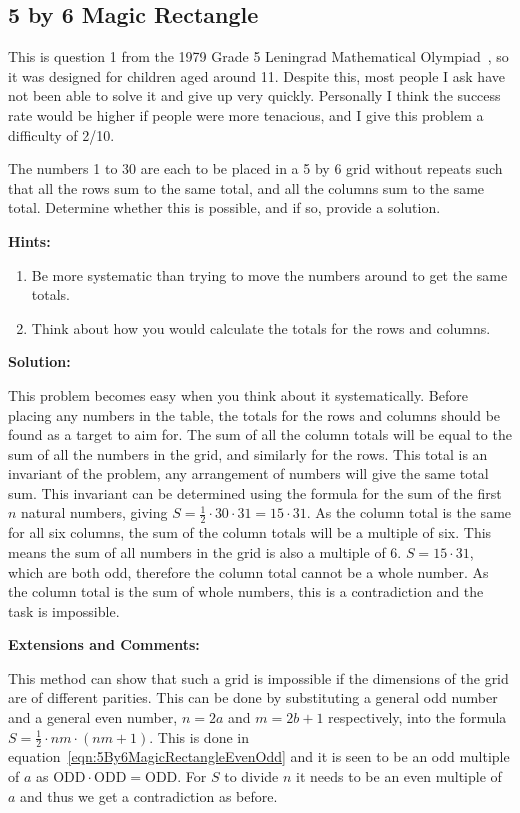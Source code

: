 
\subsection{5 by 6 Magic Rectangle}

This is question 1 from the 1979 Grade 5 Leningrad Mathematical Olympiad~\cite{Grade5LeningradOlympiad}, so it was designed for children aged around 11. Despite this, most people I ask have not been able to solve it and give up very quickly. Personally I think the success rate would be higher if people were more tenacious, and I give this problem a difficulty of 2/10.

The numbers 1 to 30 are each to be placed in a 5 by 6 grid without repeats such that all the rows sum to the same total, and all the columns sum to the same total. Determine whether this is possible, and if so, provide a solution.

\textbf{Hints:}

\begin{enumerate}
	\item Be more systematic than trying to move the numbers around to get the same totals.
	\item Think about how you would calculate the totals for the rows and columns.
\end{enumerate}

\textbf{Solution:}

This problem becomes easy when you think about it systematically. Before placing any numbers in the table, the totals for the rows and columns should be found as a target to aim for. The sum of all the column totals will be equal to the sum of all the numbers in the grid, and similarly for the rows. This total is an invariant of the problem, any arrangement of numbers will give the same total sum. This invariant can be determined using the formula for the sum of the first $n$ natural numbers, giving $S = \frac{1}{2} \cdot 30 \cdot 31 = 15 \cdot 31$. As the column total is the same for all six columns, the sum of the column totals will be a multiple of six. This means the sum of all numbers in the grid is also a multiple of 6. $S = 15 \cdot 31$, which are both odd, therefore the column total cannot be a whole number. As the column total is the sum of whole numbers, this is a contradiction and the task is impossible.

\textbf{Extensions and Comments:}

This method can show that such a grid is impossible if the dimensions of the grid are of different parities. This can be done by substituting a general odd number and a general even number, $n = 2a$ and $m = 2b + 1$ respectively, into the formula $S = \frac{1}{2} \cdot nm  \cdot (nm + 1)$. This is done in equation~\eqref{eqn:5By6MagicRectangleEvenOdd} and it is seen to be an odd multiple of $a$ as $\text{ODD} \cdot \text{ODD} = \text{ODD}$. For $S$ to divide $n$ it needs to be an even multiple of $a$ and thus we get a contradiction as before.

